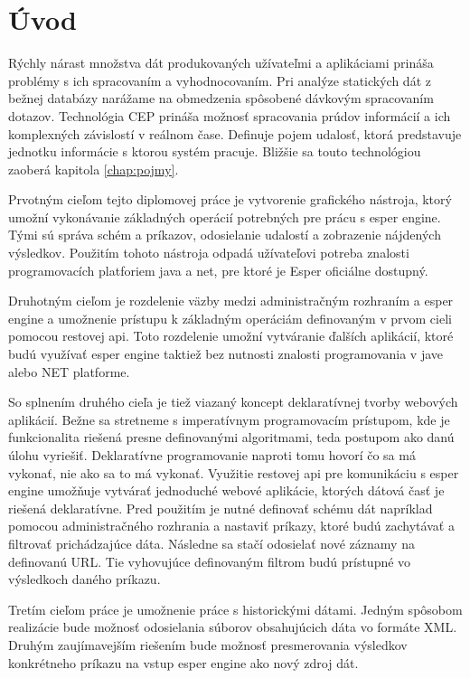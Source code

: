 \chapter*{Úvod}

Rýchly nárast množstva dát produkovaných užívateľmi a aplikáciami prináša problémy s ich spracovaním a vyhodnocovaním. Pri analýze statických dát z bežnej databázy narážame na obmedzenia spôsobené dávkovým spracovaním dotazov. Technológia \ac{CEP} prináša možnosť spracovania prúdov informácií a ich komplexných závislostí v reálnom čase. Definuje pojem udalosť, ktorá predstavuje jednotku informácie s ktorou systém pracuje. Bližšie sa touto technológiou zaoberá kapitola \ref{chap:pojmy}.

Prvotným cieľom tejto diplomovej práce je vytvorenie grafického nástroja, ktorý umožní vykonávanie základných operácií potrebných pre prácu s esper engine. Tými sú správa schém a príkazov, odosielanie udalostí a zobrazenie nájdených výsledkov. Použitím tohoto nástroja odpadá užívateľovi potreba znalosti programovacích platforiem java a net, pre ktoré je Esper oficiálne dostupný.

Druhotným cieľom je rozdelenie väzby medzi administračným rozhraním a esper engine a umožnenie prístupu k základným operáciám definovaným v prvom cieli pomocou restovej api. Toto rozdelenie umožní vytváranie ďalších aplikácií, ktoré budú využívať esper engine taktiež bez nutnosti znalosti programovania v jave alebo NET platforme.

So splnením druhého cieľa je tiež viazaný koncept deklaratívnej tvorby webových aplikácií. Bežne sa stretneme s imperatívnym programovacím prístupom, kde je funkcionalita riešená presne definovanými algoritmami, teda postupom ako danú úlohu vyriešiť. Deklaratívne programovanie naproti tomu hovorí čo sa má vykonať, nie ako sa to má vykonať.
Využitie restovej api pre komunikáciu s esper engine umožňuje vytvárať jednoduché webové aplikácie, ktorých dátová časť je riešená deklaratívne. Pred použitím je nutné definovať schému dát napríklad pomocou administračného rozhrania a nastaviť príkazy, ktoré budú zachytávať a filtrovať prichádzajúce dáta. Následne sa stačí odosielať nové záznamy na definovanú URL. Tie vyhovujúce definovaným filtrom budú prístupné vo výsledkoch daného príkazu.

Tretím cieľom práce je umožnenie práce s historickými dátami. Jedným spôsobom realizácie bude možnosť odosielania súborov obsahujúcich dáta vo formáte XML. Druhým zaujímavejším riešením bude možnosť presmerovania výsledkov konkrétneho príkazu na vstup esper engine ako nový zdroj dát.


